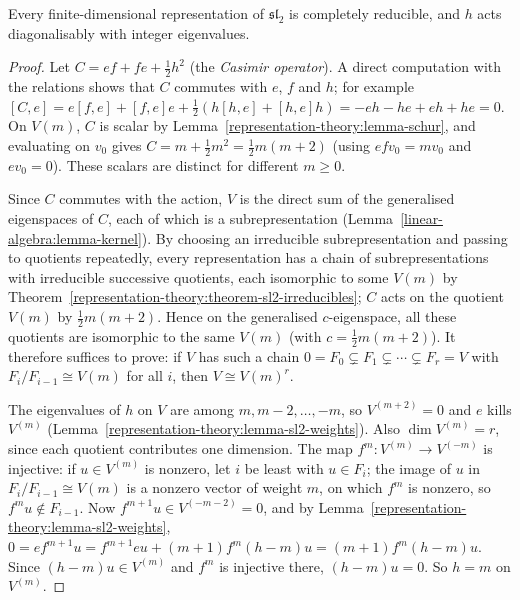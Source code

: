 \begin{theorem}\label{representation-theory:theorem-sl2-semisimple}
Every finite-dimensional representation of $\mathfrak{sl}_2$ is completely reducible, and $h$ acts
diagonalisably with integer eigenvalues.
\end{theorem}

\begin{proof}
Let $C = ef + fe + \frac12h^2$ (the \emph{Casimir operator}). A direct computation with the relations shows that $C$
commutes with $e$, $f$ and $h$; for example
$[C, e] = e[f, e] + [f, e]e + \frac12(h[h, e] + [h, e]h) = -eh - he + eh + he = 0$. On $V(m)$, $C$ is scalar by
Lemma~\ref{representation-theory:lemma-schur}, and evaluating on $v_0$ gives
$C = m + \frac12m^2 = \frac12m(m + 2)$ (using $efv_0 = mv_0$ and $ev_0 = 0$). These scalars are distinct for different $m \geq 0$.

Since $C$ commutes with the action, $V$ is the direct sum of the generalised eigenspaces of $C$, each of which is
a subrepresentation (Lemma~\ref{linear-algebra:lemma-kernel}). By choosing an irreducible subrepresentation
and passing to quotients repeatedly, every representation has a chain of subrepresentations with irreducible
successive quotients, each isomorphic to some $V(m)$ by
Theorem~\ref{representation-theory:theorem-sl2-irreducibles}; $C$ acts on the quotient $V(m)$ by
$\frac12m(m+2)$. Hence on the generalised $c$-eigenspace, all these quotients are isomorphic to the same $V(m)$
(with $c = \frac12m(m+2)$). It therefore suffices to prove: if $V$ has such a chain
$0 = F_0 \subsetneq F_1 \subsetneq \cdots \subsetneq F_r = V$ with $F_i/F_{i-1} \cong V(m)$ for all $i$, then $V \cong V(m)^r$.

The eigenvalues of $h$ on $V$ are among $m, m - 2, \ldots, -m$, so $V^{(m + 2)} = 0$ and $e$ kills
$V^{(m)}$ (Lemma~\ref{representation-theory:lemma-sl2-weights}). Also $\dim V^{(m)} = r$, since each
quotient contributes one dimension. The map $f^m \colon V^{(m)} \to V^{(-m)}$ is injective: if $u \in V^{(m)}$ is nonzero, let
$i$ be least with $u \in F_i$; the image of $u$ in $F_i/F_{i-1} \cong V(m)$ is a nonzero vector of weight $m$, on which
$f^m$ is nonzero, so $f^mu \notin F_{i-1}$. Now $f^{m+1}u \in V^{(-m-2)} = 0$, and by
Lemma~\ref{representation-theory:lemma-sl2-weights},
$0 = ef^{m+1}u = f^{m+1}eu + (m + 1)f^m(h - m)u = (m + 1)f^m(h - m)u$. Since $(h - m)u \in V^{(m)}$ and $f^m$ is
injective there, $(h - m)u = 0$. So $h = m$ on $V^{(m)}$.


\end{proof}
